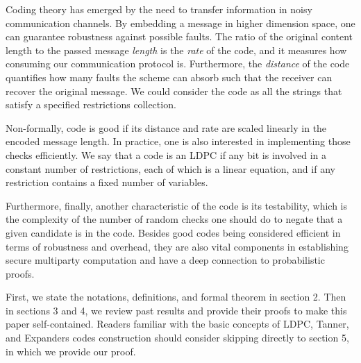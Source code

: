 Coding theory has emerged by the need to transfer information in noisy communication channels. By embedding a message in higher dimension space, one can guarantee robustness against possible faults. The ratio of the original content length to the passed message \emph{length} is the \emph{rate} of the code, and it measures how consuming our communication protocol is. Furthermore, the \emph{distance} of the code quantifies how many faults the scheme can absorb such that the receiver can recover the original message. We could consider the code as all the strings that satisfy a specified restrictions collection.
  

  Non-formally, code is good if its distance and rate are scaled linearly in the encoded message length. In practice, one is also interested in implementing those checks efficiently. We say that a code is an LDPC if any bit is involved in a constant number of restrictions, each of which is a linear equation, and if any restriction contains a fixed number of variables.

  Furthermore, finally, another characteristic of the code is its testability, which is the complexity of the number of random checks one should do to negate that a given candidate is in the code. Besides good codes being considered efficient in terms of robustness and overhead, they are also vital components in establishing secure multiparty computation \cite{MultiParty} and have a deep connection to probabilistic proofs.

  First, we state the notations, definitions, and formal theorem in section 2. Then in sections 3 and 4, we review past results and provide their proofs to make this paper self-contained. Readers familiar with the basic concepts of LDPC, Tanner, and Expanders codes construction should consider skipping directly to section 5, in which we provide our proof. 


